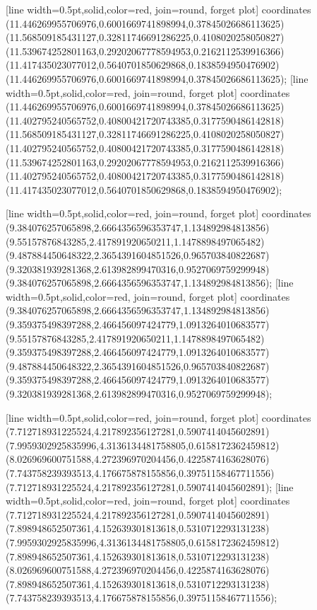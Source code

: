 [line width=0.5pt,solid,color=red, join=round, forget plot] coordinates {(11.446269955706976,0.6001669741898994,0.37845026686113625) (11.568509185431127,0.32811746691286225,0.4108020258050827) (11.539674252801163,0.29202067778594953,0.2162112539916366) (11.417435023077012,0.5640701850629868,0.1838594950476902) (11.446269955706976,0.6001669741898994,0.37845026686113625)};
[line width=0.5pt,solid,color=red, join=round, forget plot] coordinates {(11.446269955706976,0.6001669741898994,0.37845026686113625) (11.402795240565752,0.40800421720743385,0.3177590486142818) (11.568509185431127,0.32811746691286225,0.4108020258050827) (11.402795240565752,0.40800421720743385,0.3177590486142818) (11.539674252801163,0.29202067778594953,0.2162112539916366) (11.402795240565752,0.40800421720743385,0.3177590486142818) (11.417435023077012,0.5640701850629868,0.1838594950476902)};

[line width=0.5pt,solid,color=red, join=round, forget plot] coordinates {(9.384076257065898,2.6664356596353747,1.134892984813856) (9.55157876843285,2.417891920650211,1.1478898497065482) (9.487884450648322,2.3654391604851526,0.965703840822687) (9.320381939281368,2.613982899470316,0.9527069759299948) (9.384076257065898,2.6664356596353747,1.134892984813856)};
[line width=0.5pt,solid,color=red, join=round, forget plot] coordinates {(9.384076257065898,2.6664356596353747,1.134892984813856) (9.359375498397288,2.466456097424779,1.0913264010683577) (9.55157876843285,2.417891920650211,1.1478898497065482) (9.359375498397288,2.466456097424779,1.0913264010683577) (9.487884450648322,2.3654391604851526,0.965703840822687) (9.359375498397288,2.466456097424779,1.0913264010683577) (9.320381939281368,2.613982899470316,0.9527069759299948)};

[line width=0.5pt,solid,color=red, join=round, forget plot] coordinates {(7.712718931225524,4.217892356127281,0.5907414045602891) (7.9959302925835996,4.3136134481758805,0.6158172362459812) (8.026969600751588,4.272396970204456,0.4225874163628076) (7.743758239393513,4.176675878155856,0.39751158467711556) (7.712718931225524,4.217892356127281,0.5907414045602891)};
[line width=0.5pt,solid,color=red, join=round, forget plot] coordinates {(7.712718931225524,4.217892356127281,0.5907414045602891) (7.898948652507361,4.152639301813618,0.5310712293131238) (7.9959302925835996,4.3136134481758805,0.6158172362459812) (7.898948652507361,4.152639301813618,0.5310712293131238) (8.026969600751588,4.272396970204456,0.4225874163628076) (7.898948652507361,4.152639301813618,0.5310712293131238) (7.743758239393513,4.176675878155856,0.39751158467711556)};

